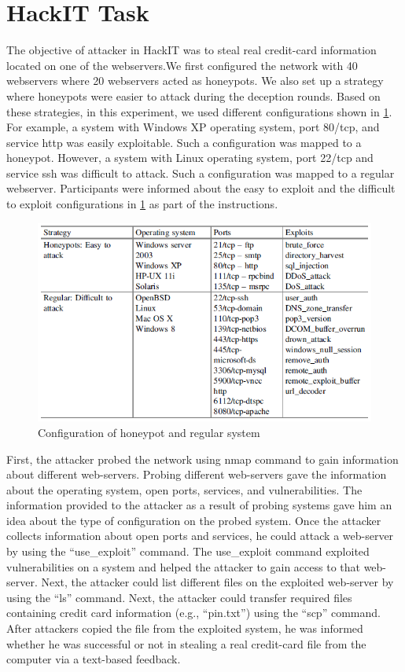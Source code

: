 \section{HackIT Task}
The objective of attacker in HackIT was to steal real credit-card information located on one of the webservers.We first configured the network with 40 webservers where 20 webservers acted as honeypots. We also set up a strategy where honeypots were easier to attack during the deception rounds. Based on these strategies, in this experiment, we used different configurations shown in \ref{fig:figure7}. For example, a system with Windows XP operating system, port 80/tcp, and service http was easily exploitable. Such a configuration was mapped to a honeypot. However, a system with Linux operating system, port 22/tcp and service ssh was difficult to
attack. Such a configuration was mapped to a regular webserver. Participants were informed about the easy to exploit and the difficult to exploit configurations in \ref{fig:figure7} as part of the instructions.

\FloatBarrier
\begin{figure}[!htbp]
\centering
  \includegraphics[scale=0.6]{Chap3/exploits.PNG}
  \caption{Configuration of honeypot and regular system}\label{fig:figure7}
\end{figure} 
First, the attacker probed the network using nmap command to gain information about different web-servers. Probing different web-servers gave the information about the operating system, open ports, services, and vulnerabilities. The information provided to the attacker as a result of probing systems gave him an idea about the type of configuration on the probed system. Once the attacker collects information about open ports and services, he could attack a web-server by using the \enquote{use\_exploit} command.
The use\_exploit command exploited vulnerabilities on a system and helped the attacker to gain access to that web-server. Next, the attacker could list different files on the exploited web-server by using the “ls” command. Next, the attacker could transfer required files containing credit card information (e.g., \enquote{pin.txt}) using the \enquote{scp} command. After attackers copied the file from the exploited system, he was informed whether he was successful or not in stealing a real credit-card file from the computer via a text-based feedback.
